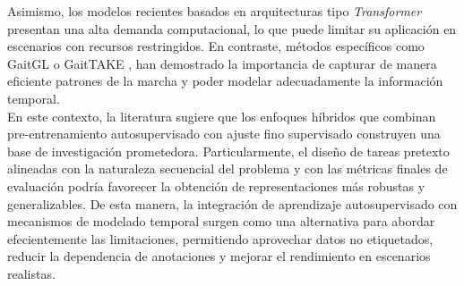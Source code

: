 Asimismo, los modelos recientes basados en arquitecturas tipo \textit{Transformer} presentan una alta demanda computacional, lo que puede limitar su aplicación en escenarios con recursos restringidos. En contraste, métodos específicos como GaitGL \cite{Lin2022GaitGL} o GaitTAKE \cite{Hsu2022GaitTAKE}, han demostrado la importancia de capturar de manera eficiente patrones de la marcha y poder modelar adecuadamente la información temporal. \\
En este contexto, la literatura sugiere que los enfoques híbridos que combinan pre-entrenamiento autosupervisado con ajuste fino supervisado construyen una base de investigación prometedora. Particularmente, el diseño de tareas pretexto alineadas con la naturaleza secuencial del problema y con las métricas finales de evaluación podría favorecer la obtención de representaciones más robustas y generalizables. De esta manera, la integración de aprendizaje autosupervisado con mecanismos de modelado temporal surgen como una alternativa para abordar efecientemente las limitaciones, permitiendo aprovechar datos no etiquetados, reducir la dependencia de anotaciones y mejorar el rendimiento en escenarios realistas.